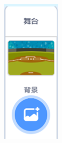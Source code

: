 \documentclass[10.5pt, a4paper]{article}
\begin{document}
\begin{figure}[htbp]
\begin{minipage}[t]{.23\textwidth}
\begin{minipage}[t]{.23\textwidth}
                \includegraphics[width=\textwidth]{28-1.png}

\end{minipage}
\end{minipage}
\end{figure}
\end{document}
